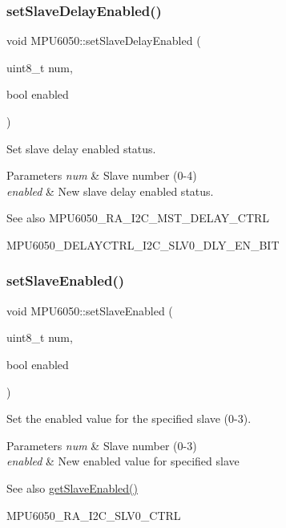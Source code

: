 \subsubsection{\texorpdfstring{setSlaveDelayEnabled()}{setSlaveDelayEnabled()}}
{\footnotesize\ttfamily void M\+P\+U6050\+::set\+Slave\+Delay\+Enabled (\begin{DoxyParamCaption}\item[{uint8\+\_\+t}]{num,  }\item[{bool}]{enabled }\end{DoxyParamCaption})}

Set slave delay enabled status. 
\begin{DoxyParams}{Parameters}
{\em num} & Slave number (0-\/4) \\
\hline
{\em enabled} & New slave delay enabled status. \\
\hline
\end{DoxyParams}
\begin{DoxySeeAlso}{See also}
M\+P\+U6050\+\_\+\+R\+A\+\_\+\+I2\+C\+\_\+\+M\+S\+T\+\_\+\+D\+E\+L\+A\+Y\+\_\+\+C\+T\+RL 

M\+P\+U6050\+\_\+\+D\+E\+L\+A\+Y\+C\+T\+R\+L\+\_\+\+I2\+C\+\_\+\+S\+L\+V0\+\_\+\+D\+L\+Y\+\_\+\+E\+N\+\_\+\+B\+IT 
\end{DoxySeeAlso}
\mbox{\label{class_m_p_u6050_afaffa021d7bb41f3a288827080602eee}} 
\subsubsection{\texorpdfstring{setSlaveEnabled()}{setSlaveEnabled()}}
{\footnotesize\ttfamily void M\+P\+U6050\+::set\+Slave\+Enabled (\begin{DoxyParamCaption}\item[{uint8\+\_\+t}]{num,  }\item[{bool}]{enabled }\end{DoxyParamCaption})}

Set the enabled value for the specified slave (0-\/3). 
\begin{DoxyParams}{Parameters}
{\em num} & Slave number (0-\/3) \\
\hline
{\em enabled} & New enabled value for specified slave \\
\hline
\end{DoxyParams}
\begin{DoxySeeAlso}{See also}
\mbox{\hyperlink{class_m_p_u6050_a5f14bde83fe00b27dec6776fc44e89c2}{get\+Slave\+Enabled()}} 

M\+P\+U6050\+\_\+\+R\+A\+\_\+\+I2\+C\+\_\+\+S\+L\+V0\+\_\+\+C\+T\+RL 
\end{DoxySeeAlso}
\mbox{\label{class_m_p_u6050_a34a1def575f6abcd464afe954de8a461}} 
